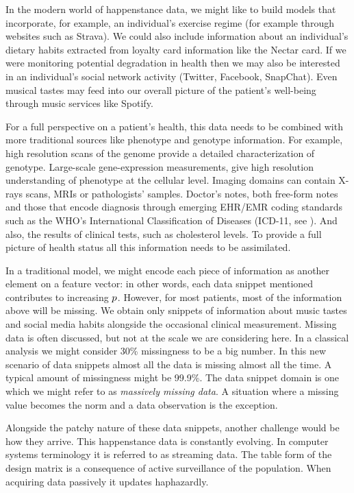 \documentclass[a4paperpaper,]{article}
\begin{document}
In the modern world of happenstance data, we might like to build models
that incorporate, for example, an individual's exercise regime (for
example through websites such as Strava). We could also include
information about an individual's dietary habits extracted from loyalty
card information like the Nectar card. If we were monitoring potential
degradation in health then we may also be interested in an individual's
social network activity (Twitter, Facebook, SnapChat). Even musical
tastes may feed into our overall picture of the patient's well-being
through music services like Spotify.

For a full perspective on a patient's health, this data needs to be
combined with more traditional sources like phenotype and genotype
information. For example, high resolution scans of the genome provide a
detailed characterization of genotype. Large-scale gene-expression
measurements, give high resolution understanding of phenotype at the
cellular level. Imaging domains can contain X-rays scans, MRIs or
pathologists' samples. Doctor's notes, both free-form notes and those
that encode diagnosis through emerging EHR/EMR coding standards such as
the WHO's International Classification of Diseases (ICD-11, see
\citet{WHO-icd20}). And also, the results of clinical tests, such as
cholesterol levels. To provide a full picture of health status all this
information needs to be assimilated.

In a traditional model, we might encode each piece of information as
another element on a feature vector: in other words, each data snippet
mentioned contributes to increasing \(p\). However, for most
patients, most of the information above will be missing. We obtain only
snippets of information about music tastes and social media habits
alongside the occasional clinical measurement. Missing data is often
discussed, but not at the scale we are considering here. In a classical
analysis we might consider 30\% missingness to be a big number. In this
new scenario of data snippets almost all the data is missing almost all
the time. A typical amount of missingness might be 99.9\%. The data
snippet domain is one which we might refer to as \emph{massively missing
data}. A situation where a missing value becomes the norm and a data
observation is the exception.

Alongside the patchy nature of these data snippets, another challenge
would be how they arrive. This happenstance data is constantly evolving.
In computer systems terminology it is referred to as streaming data. The
table form of the design matrix is a consequence of active surveillance
of the population. When acquiring data passively it updates haphazardly.
\end{document}
